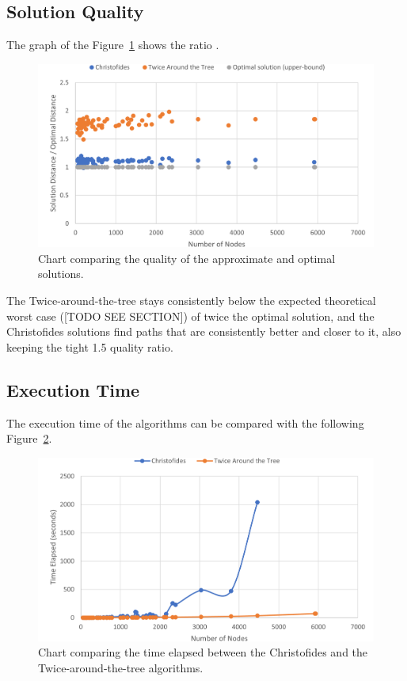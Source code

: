 \documentclass[12pt]{article}
\begin{document}
\subsection{Solution Quality}

The graph of the Figure~\ref{fig:quality_ratio} shows the ratio .

\begin{figure}[ht]
\centering
\includegraphics[height=.325\textheight]{quality_ratio.png}
\caption{Chart comparing the quality of the approximate and optimal solutions.}
\label{fig:quality_ratio}
\end{figure}

The Twice-around-the-tree stays consistently below the expected theoretical worst case ([TODO SEE SECTION]) of 
twice the optimal solution, and the Christofides solutions find paths that are consistently better and closer to it, 
also keeping the tight 1.5 quality ratio.

\subsection{Execution Time}

The execution time of the algorithms can be compared with the following Figure~\ref{fig:exec_time}.

\begin{figure}[ht]
\centering
\includegraphics[height=.325\textheight]{execution_time_comparison.png}
\caption{Chart comparing the time elapsed between the Christofides and the Twice-around-the-tree algorithms.}
\label{fig:exec_time}
\end{figure}
\end{document}
